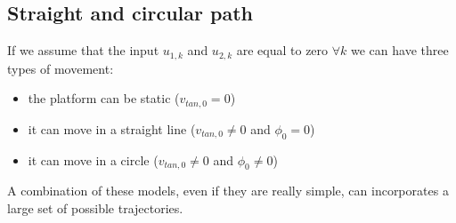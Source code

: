 \subsection{Straight and circular path} \label{subsec:circularlinearmodel}
If we assume that the input $u_{1,k}$ and $u_{2,k}$  are equal to zero $\forall k$ we can have three types of movement:
\begin{itemize}
\item the platform can be static ($v_{tan,0} = 0$)
\item it can move in a straight line ($v_{tan,0} \neq 0$ and $\phi_0 = 0$)
\item it can move in a circle ($v_{tan,0} \neq 0$ and $\phi_0 \neq 0$)
\end{itemize}
A combination of these models, even if they are really simple, can incorporates a large set of possible trajectories.

